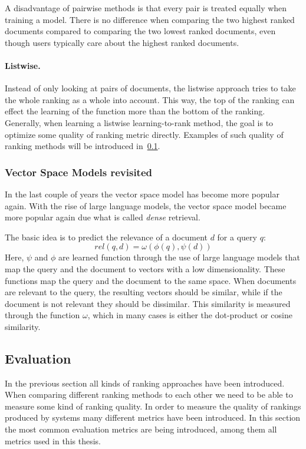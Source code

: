 A disadvantage of pairwise methods is that every pair is treated equally when training a model. There is no difference when comparing the two highest ranked documents compared to comparing the two lowest ranked documents, even though users typically care about the highest ranked documents. 

\paragraph{Listwise.} Instead of only looking at pairs of documents, the listwise approach tries to take the whole ranking as a whole into account. This way, the top of the ranking can effect the learning of the function more than the bottom of the ranking.
Generally, when learning a listwise learning-to-rank method, the goal is to optimize some quality of ranking metric directly. Examples of such quality of ranking methods will be introduced in~\cref{sec:evaluation}.

\subsubsection{Vector Space Models revisited}
In the last couple of years the vector space model has become more popular again. With the rise of large language models, the vector space model became more popular again due what is called \emph{dense} retrieval.  

The basic idea is to predict the relevance of a document $d$ for a query $q$:
\begin{equation}
	\mathit{rel}(q, d) = \omega\left(\phi\left(q\right),
	\psi\left(d\right)\right)
\end{equation}
Here, $\psi$ and $\phi$ are learned function through the use of large language models that map the query and the document to vectors with a low dimensionality. These functions map the query and the document to the same space. When documents are relevant to the query, the resulting vectors should be similar, while if the document is not relevant they should be dissimilar. This similarity is measured through the function $\omega$, which in many cases is either the dot-product or cosine similarity. 

\subsection{Evaluation}
\label{sec:evaluation}
In the previous section all kinds of ranking approaches have been introduced. When comparing different ranking methods to each other we need to be able to measure some kind of ranking quality. In order to measure the quality of rankings produced by systems many different metrics have been introduced. In this section the most common evaluation metrics are being introduced, among them all metrics used in this thesis. 

